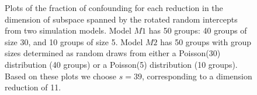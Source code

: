 \documentclass[12pt]{article} %
\newcommand{\al}[1]{{\color{red} #1}}
\begin{document}
%
\begin{figure}[htb]
	\centering
	\caption{\label{fig:elbow} Plots of the fraction of confounding for each reduction in the dimension of subspace spanned by the rotated random intercepts from two simulation models. Model $M1$ has 50 groups: 40 groups of size 30, and 10 groups of size 5. Model $M2$ has 50 groups with group sizes determined as random draws from either a Poisson(30) distribution (40 groups) or a Poisson(5) distribution (10 groups). Based on these plots we  choose $s = 39$, corresponding to a dimension reduction of 11.}
\end{figure}
\end{document}
